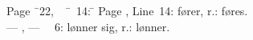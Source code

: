 \documentclass[12pt,a4paper]{book}
\begin{document}
\noindent
\begin{tabbing}
Page \=\ 22,\ \ \=\ \ 14: \=\kill
Page , \> Line\ 14: \> fører, r.: føres.\\
--- , \> --- \ \ 6: \> lønner sig, r.: lønner.
\end{tabbing}
\end{document}

